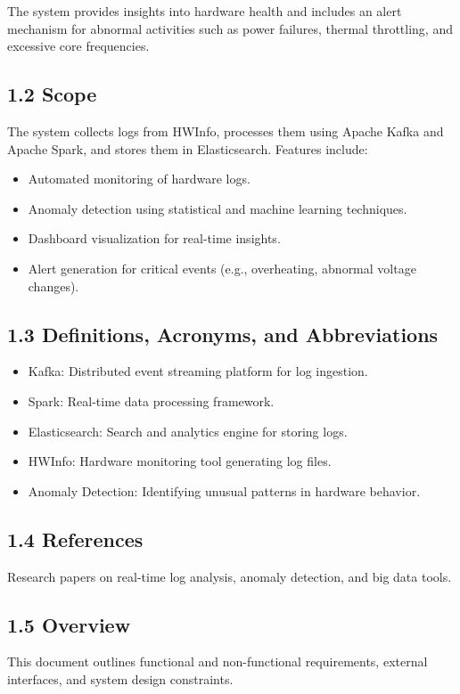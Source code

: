 \documentclass[a4paper,12pt]{report}
\begin{document}
The system provides insights into hardware health and includes an alert mechanism for abnormal activities such as power failures, thermal throttling, and excessive core frequencies.

\subsection{1.2 Scope}
The system collects logs from HWInfo, processes them using Apache Kafka and Apache Spark, and stores them in Elasticsearch. Features include:
\begin{itemize}
    \item Automated monitoring of hardware logs.
    \item Anomaly detection using statistical and machine learning techniques.
    \item Dashboard visualization for real-time insights.
    \item Alert generation for critical events (e.g., overheating, abnormal voltage changes).
\end{itemize}

\subsection{1.3 Definitions, Acronyms, and Abbreviations}
\begin{itemize}
    \item Kafka: Distributed event streaming platform for log ingestion.
    \item Spark: Real-time data processing framework.
    \item Elasticsearch: Search and analytics engine for storing logs.
    \item HWInfo: Hardware monitoring tool generating log files.
    \item Anomaly Detection: Identifying unusual patterns in hardware behavior.
\end{itemize}

\subsection{1.4 References}
Research papers on real-time log analysis, anomaly detection, and big data tools.

\subsection{1.5 Overview}
This document outlines functional and non-functional requirements, external interfaces, and system design constraints.
\end{document}
